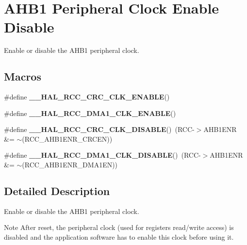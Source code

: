 \hypertarget{group___r_c_c___a_h_b1___clock___enable___disable}{}\section{A\+H\+B1 Peripheral Clock Enable Disable}
\label{group___r_c_c___a_h_b1___clock___enable___disable}


Enable or disable the A\+H\+B1 peripheral clock.  


\subsection*{Macros}
\begin{DoxyCompactItemize}
\item 
\#define {\bfseries \+\_\+\+\_\+\+H\+A\+L\+\_\+\+R\+C\+C\+\_\+\+C\+R\+C\+\_\+\+C\+L\+K\+\_\+\+E\+N\+A\+B\+LE}()
\item 
\#define {\bfseries \+\_\+\+\_\+\+H\+A\+L\+\_\+\+R\+C\+C\+\_\+\+D\+M\+A1\+\_\+\+C\+L\+K\+\_\+\+E\+N\+A\+B\+LE}()
\item 
\mbox{\label{group___r_c_c___a_h_b1___clock___enable___disable_ga170a30954a78a81a8f9b381378e0c9af}} 
\#define {\bfseries \+\_\+\+\_\+\+H\+A\+L\+\_\+\+R\+C\+C\+\_\+\+C\+R\+C\+\_\+\+C\+L\+K\+\_\+\+D\+I\+S\+A\+B\+LE}()~(R\+CC-\/$>$A\+H\+B1\+E\+NR \&= $\sim$(R\+C\+C\+\_\+\+A\+H\+B1\+E\+N\+R\+\_\+\+C\+R\+C\+EN))
\item 
\mbox{\label{group___r_c_c___a_h_b1___clock___enable___disable_ga569dc8b9e178a8afab2664fdf87f46c5}} 
\#define {\bfseries \+\_\+\+\_\+\+H\+A\+L\+\_\+\+R\+C\+C\+\_\+\+D\+M\+A1\+\_\+\+C\+L\+K\+\_\+\+D\+I\+S\+A\+B\+LE}()~(R\+CC-\/$>$A\+H\+B1\+E\+NR \&= $\sim$(R\+C\+C\+\_\+\+A\+H\+B1\+E\+N\+R\+\_\+\+D\+M\+A1\+EN))
\end{DoxyCompactItemize}


\subsection{Detailed Description}
Enable or disable the A\+H\+B1 peripheral clock. 

\begin{DoxyNote}{Note}
After reset, the peripheral clock (used for registers read/write access) is disabled and the application software has to enable this clock before using it. 
\end{DoxyNote}


